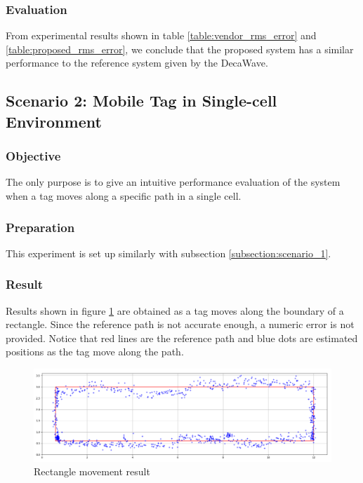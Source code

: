 \documentclass[\main/main.tex]{subfiles}
\begin{document}

\subsubsection{Evaluation}
From experimental results shown in table \ref{table:vendor_rms_error} and \ref{table:proposed_rms_error}, we conclude that the proposed system has a similar performance to the reference system given by the DecaWave.

\subsection{Scenario 2: Mobile Tag in Single-cell Environment}

\subsubsection{Objective}
The only purpose is to give an intuitive performance evaluation of the system when a tag moves along a specific path in a single cell.
\subsubsection{Preparation}
This experiment is set up similarly with subsection \ref{subsection:scenario_1}.
\subsubsection{Result}

Results shown in figure \ref{fig:result_rectangle} are obtained as a tag moves along the boundary of a rectangle. Since the reference path is not accurate enough, a numeric error is not provided. Notice that red lines are the reference path and blue dots are estimated positions as the tag move along the path.

\begin{figure}[H]
    \centering
    \includegraphics[width=1\textwidth]{result_square.png}
    \caption{Rectangle movement result}
    \label{fig:result_rectangle}
\end{figure}
\end{document}

